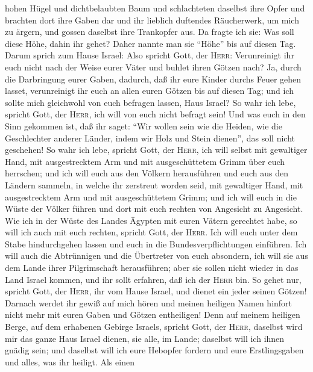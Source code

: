 hohen Hügel und dichtbelaubten Baum und schlachteten daselbst ihre Opfer
und brachten dort ihre Gaben dar und ihr lieblich duftendes Räucherwerk,
um mich zu ärgern, und gossen daselbst ihre Trankopfer aus.
 Da fragte ich sie: Was soll diese Höhe, dahin ihr gehet?
Daher nannte man sie ``Höhe'' bis auf diesen Tag.  Darum
sprich zum Hause Israel: Also spricht Gott, der \textsc{Herr}:
Verunreinigt ihr euch nicht nach der Weise eurer Väter und buhlet ihren
Götzen nach?  Ja, durch die Darbringung eurer Gaben,
dadurch, daß ihr eure Kinder durchs Feuer gehen lasset, verunreinigt ihr
euch an allen euren Götzen bis auf diesen Tag; und ich sollte mich
gleichwohl von euch befragen lassen, Haus Israel? So wahr ich lebe,
spricht Gott, der \textsc{Herr}, ich will von euch nicht befragt sein!
 Und was euch in den Sinn gekommen ist, daß ihr saget:
``Wir wollen sein wie die Heiden, wie die Geschlechter anderer Länder,
indem wir Holz und Stein dienen'', das soll nicht geschehen!
 So wahr ich lebe, spricht Gott, der \textsc{Herr}, ich
will selbst mit gewaltiger Hand, mit ausgestrecktem Arm und mit
ausgeschüttetem Grimm über euch herrschen;  und ich will
euch aus den Völkern herausführen und euch aus den Ländern sammeln, in
welche ihr zerstreut worden seid, mit gewaltiger Hand, mit
ausgestrecktem Arm und mit ausgeschüttetem Grimm;  und
ich will euch in die Wüste der Völker führen und dort mit euch rechten
von Angesicht zu Angesicht.  Wie ich in der Wüste des
Landes Ägypten mit euren Vätern gerechtet habe, so will ich auch mit
euch rechten, spricht Gott, der \textsc{Herr}.  Ich will
euch unter dem Stabe hindurchgehen lassen und euch in die
Bundesverpflichtungen einführen.  Ich will auch die
Abtrünnigen und die Übertreter von euch absondern, ich will sie aus dem
Lande ihrer Pilgrimschaft herausführen; aber sie sollen nicht wieder in
das Land Israel kommen, und ihr sollt erfahren, daß ich der
\textsc{Herr} bin.  So gehet nur, spricht Gott, der
\textsc{Herr}, ihr vom Hause Israel, und dienet ein jeder seinen Götzen!
Darnach werdet ihr gewiß auf mich hören und meinen heiligen Namen
hinfort nicht mehr mit euren Gaben und Götzen entheiligen!
 Denn auf meinem heiligen Berge, auf dem erhabenen
Gebirge Israels, spricht Gott, der \textsc{Herr}, daselbst wird mir das
ganze Haus Israel dienen, sie alle, im Lande; daselbst will ich ihnen
gnädig sein; und daselbst will ich eure Hebopfer fordern und eure
Erstlingsgaben und alles, was ihr heiligt.  Als einen
